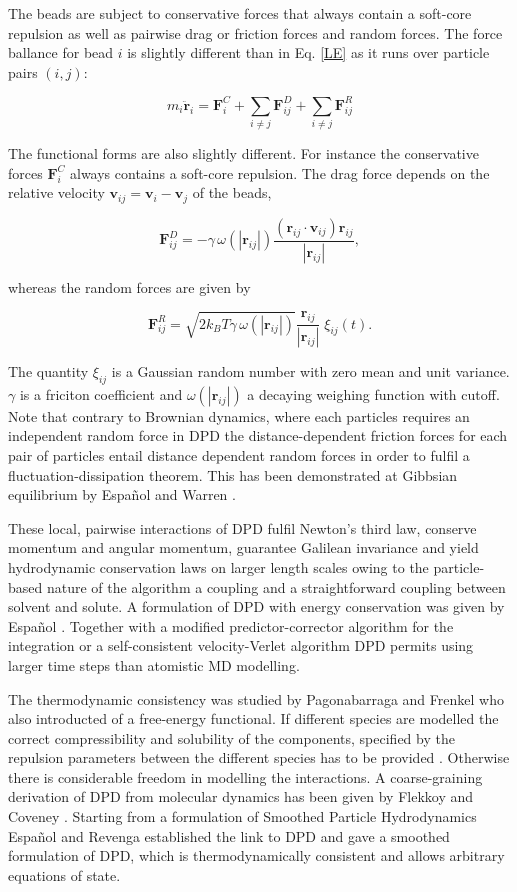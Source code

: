 \documentclass[8.5pt,twoside,twocolumn]{article}
\newcommand{\beq}{\begin{equation}}
\newcommand{\eeq}{\end{equation}}
\begin{document}
The beads are subject to conservative forces that always contain a soft-core repulsion as well as pairwise drag
or friction forces and random forces. The force ballance for bead $i$ is slightly different than in Eq. \ref{LE} as it 
runs over particle pairs $(i,j)$:

\beq
m_i \ddot{{\mathbf{r}}}_i=\mathbf{F}_i^C+\sum_{i\neq j}\mathbf{F}_{i j}^D + \sum_{i\neq j}\mathbf{F}_{i j}^R
\eeq

The functional forms are also slightly different. For instance the conservative forces $\mathbf{F}_i^C$ always contains a soft-core repulsion. 
The drag force depends on the relative velocity $\mathbf{v}_{ij} = \mathbf{v}_i - \mathbf{v}_j$ of the beads,

\beq
\mathbf{F}_{ij}^D=-\gamma\,\omega(|\mathbf{r}_{ij}|)\frac{(\mathbf{r}_{ij}\cdot\mathbf{v}_{ij})\mathbf{r}_{ij}}{|\mathbf{r}_{ij}|},
\eeq

whereas the random forces are given by

\beq
\mathbf{F}_{ij}^R=\sqrt{2 k_B T \gamma\, \omega(|\mathbf{r}_{ij}|)} \frac{\mathbf{r}_{ij}}{|\mathbf{r}_{ij}|}\;\xi_{ij}(t).
\eeq

The quantity $\xi_{i j}$ is a Gaussian random number with zero mean and unit variance. $\gamma$ is a friciton coefficient and
$\omega(|\mathbf{r}_{ij}|)$ a decaying weighing function with cutoff. 
Note that contrary to Brownian dynamics, where each particles requires an independent random force in DPD the 
distance-dependent friction forces for each pair of particles entail distance dependent random forces 
in order to fulfil a fluctuation-dissipation theorem.
This has been demonstrated at Gibbsian equilibrium by Espa\~nol and Warren \cite{Espanol:1995a}.

These local, pairwise interactions of DPD fulfil Newton's third law, conserve momentum and angular momentum, 
guarantee Galilean invariance and yield hydrodynamic conservation laws on larger length scales owing to the 
particle-based nature of the algorithm a coupling and a straightforward coupling between solvent and solute.
A formulation of DPD with energy conservation was given by Espa\~nol \cite{Espanol:1997}.
Together with a modified predictor-corrector algorithm for the integration \cite{Groot:1997} or a self-consistent 
 velocity-Verlet algorithm \cite{Pagonabarraga:2001} DPD permits using larger time steps than atomistic MD 
modelling.

The thermodynamic consistency was studied by Pagonabarraga and Frenkel \cite{Pagonabarraga:2001} who also
introducted of a free-energy functional.
If different species are modelled the correct compressibility and solubility of the components, 
specified by the repulsion parameters between the different species has to be provided \cite{Groot:1997}.
Otherwise there is considerable freedom in modelling the interactions.
A coarse-graining derivation of DPD from molecular dynamics has been given by 
Flekkoy and Coveney \cite{Flekkoy:1999, Flekkoy:2000}. Starting from a 
formulation of Smoothed Particle Hydrodynamics Espa\~nol and Revenga \cite{Espanol:2003} 
established the link to DPD and gave a smoothed formulation of DPD, which 
is thermodynamically consistent and allows arbitrary equations of state. 
\end{document}
